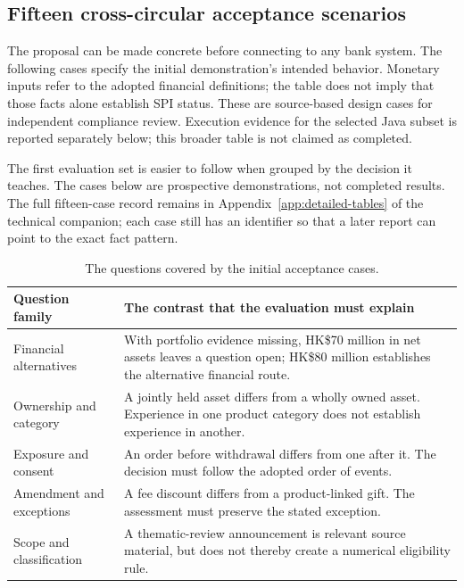 \subsection{Fifteen cross-circular acceptance scenarios}
\label{merge:P-05-evidence:00}

\label{sec:evidence}

The proposal can be made concrete before connecting to any bank system. The
following cases specify the initial demonstration's intended behavior. Monetary
inputs refer to the adopted financial definitions; the table does not imply that
those facts alone establish SPI status. These are source-based design cases for
independent compliance review. Execution evidence for the selected Java subset
is reported separately below; this broader table is not claimed as completed.

The first evaluation set is easier to follow when grouped by the decision it
teaches. The cases below are prospective demonstrations, not completed results.
The full fifteen-case record remains in Appendix~\ref{app:detailed-tables} of the technical companion; each
case still has an identifier so that a later report can point to the exact fact
pattern.

\begin{table}[H]
\centering
\caption{The questions covered by the initial acceptance cases.}
\label{tab:cases}
\begin{tabularx}{\textwidth}{P{45mm}Y}
\toprule
Question family & The contrast that the evaluation must explain\\
\midrule
Financial alternatives & With portfolio evidence missing, HK\$70 million in net assets leaves a question open; HK\$80 million establishes the alternative financial route.\\
\addlinespace[0.5em]
Ownership and category & A jointly held asset differs from a wholly owned asset. Experience in one product category does not establish experience in another.\\
\addlinespace[0.5em]
Exposure and consent & An order before withdrawal differs from one after it. The decision must follow the adopted order of events.\\
\addlinespace[0.5em]
Amendment and exceptions & A fee discount differs from a product-linked gift. The assessment must preserve the stated exception.\\
\addlinespace[0.5em]
Scope and classification & A thematic-review announcement is relevant source material, but does not thereby create a numerical eligibility rule.\\
\bottomrule
\end{tabularx}
\end{table}

